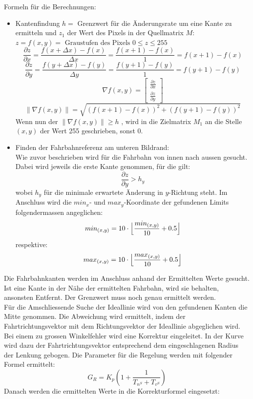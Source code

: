 Formeln für die Berechnungen:
\begin{itemize}
\item Kantenfindung $h=$ Grenzwert für die Änderungsrate um eine Kante zu ermitteln und $z_1$ der Wert des Pixels in der Quellmatrix $M$:
$z = f(x,y) = \text{ Graustufen des Pixels }0 \leq z \leq 255$\\
\[
\frac{\partial{z}}{\partial{x}}=\frac{f(x+\Delta{x})-f(x)}{\Delta{x}} = \frac{f(x+1)-f(x)}{1} = f(x+1)-f(x)
\]
\[
\frac{\partial{z}}{\partial{y}}=\frac{f(y+\Delta{x})-f(y)}{\Delta{y}} = \frac{f(y+1)-f(y)}{1} = f(y+1)-f(y)
\]
\[
\nabla f(x,y) = \begin{bmatrix}
\frac{\partial{z}}{\partial{x}}\\
\frac{\partial{z}}{\partial{y}}
\end{bmatrix}
\]
\[
\lVert\nabla f(x,y)\rVert = \sqrt{(f(x+1)-f(x))^2 + (f(y+1) - f(y))^2}
\]
Wenn nun der $\lVert\nabla f(x,y)\rVert \geq h$ , wird in die Zielmatrix $M_1$ an die Stelle $(x,y)$ der Wert 255 geschrieben, sonst 0.
\item Finden der Fahrbahnreferenz am unteren Bildrand:\\
Wie zuvor beschrieben wird für die Fahrbahn von innen nach aussen gesucht. Dabei wird jeweils die erste Kante genommen, für die gilt:
\[
\frac{\partial{z}}{\partial{y}} > h_y
\]
wobei $h_y$ für die minimale erwartete Änderung in $y$-Richtung steht. Im Anschluss wird die $min_x$- und $max_y$-Koordinate der gefundenen Limits folgendermassen angeglichen:
\[
min_{(x,y)} = 10\cdot\Bigl\lfloor\frac{min_{(x,y)}}{10}+0.5\Bigr\rfloor
\]
respektive:
\[
max_{(x,y)} = 10\cdot\Bigl\lfloor\frac{max_{(x,y)}}{10}+0.5\Bigr\rfloor
\]
\end{itemize}
Die Fahrbahnkanten werden im Anschluss anhand der Ermittelten Werte gesucht. Ist eine Kante in der Nähe der ermittelten Fahrbahn, wird sie behalten, ansonsten Entfernt. Der Grenzwert muss noch genau ermittelt werden.\\
Für die Amschliessende Suche der Ideallinie wird von den gefundenen Kanten die Mitte genommen. Die Abweichung wird ermittelt, indem der Fahrtrichtungsvektor mit dem Richtungsvektor der Ideallinie abgeglichen wird. Bei einem zu grossen Winkelfehler wird eine Korrektur eingeleitet. In der Kurve wird dazu der Fahrtrichtungsvektor entsprechend dem eingeschlagenen Radius der Lenkung gebogen. Die Parameter für die Regelung werden mit folgender Formel ermittelt:
\[
G_R = K_p\left(1 + \frac{1}{T_{n^S} + T_{v^S}}\right)
\]
Danach werden die ermittelten Werte in die Korrekturformel eingesetzt:
